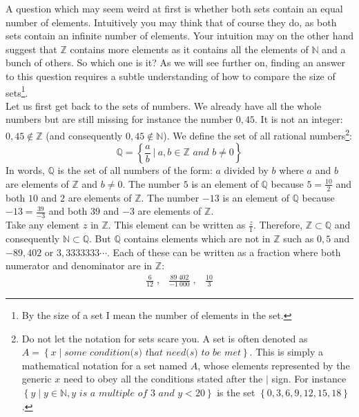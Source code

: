 \noindent A question which may seem weird at first is whether both sets contain an equal number of elements. Intuitively you may think that of course they do, as both sets contain an infinite number of elements. Your intuition may on the other hand suggest that $\mathbb{Z}$ contains more elements as it contains all the elements of $\mathbb{N}$ and a bunch of others. So which one is it? As we will see further on, finding an answer to this question requires a subtle understanding of how to compare the size of sets\footnote{By the size of a set I mean the number of elements in the set.}.\\

\noindent Let us first get back to the sets of numbers. We already have all the whole numbers but are still missing for instance the number $0,45$. It is not an integer: $0,45\notin \mathbb{Z}$ (and consequently $ 0,45 \notin \mathbb{N}$). We define the set of all rational numbers\footnote{Do not let the notation for sets scare you. A set is often denoted as $A = \left\{ x \; | \; \textit{some condition(s) that need(s) to be met} \right\}$. This is simply a mathematical notation for a set named $A$, whose elements represented by the generic $x$ need to obey all the conditions stated after the $|$ sign. For instance $\left\{ y \; | \; y \in \mathbb{N}, y\textit{ is a multiple of 3 and } y <20 \right\}$ is the set $\left\{ 0,3,6,9,12,15,18 \right\}$.}:
\begin{equation}
	\mathbb{Q} = \left\{ \frac{a}{b} \: | \: a,b \in \mathbb{Z} \textit{ and } b \neq 0 \right\}
\end{equation}
In words, $\mathbb{Q}$ is the set of all numbers of the form: $a$ divided by $b$ where $a$ and $b$ are elements of $\mathbb{Z}$ and $b \neq 0$. The number $5$ is an element of $\mathbb{Q}$ because $5 = \frac{10}{2}$ and both $10$ and $2$ are elements of $\mathbb{Z}$. The number $-13$ is an element of $\mathbb{Q}$ because $-13 = \frac{39}{-3}$ and both $39$ and $-3$ are elements of $\mathbb{Z}$.\\

\noindent Take any element $z$ in $\mathbb{Z}$. This element can be written as $\frac{z}{1}$. Therefore, $\mathbb{Z} \subset \mathbb{Q}$ and consequently $\mathbb{N} \subset \mathbb{Q}$. But $\mathbb{Q}$ contains elements which are not in $\mathbb{Z}$ such as $0,5$ and $-89,402$ or $3,3333333\cdots$. Each of these can be written as a fraction where both numerator and denominator are in $\mathbb{Z}$:
\begin{eqnarray}
	\frac{6}{12} \; , & \frac{89\:402}{-1\:000} \; , & \frac{10}{3} \nonumber
\end{eqnarray}

